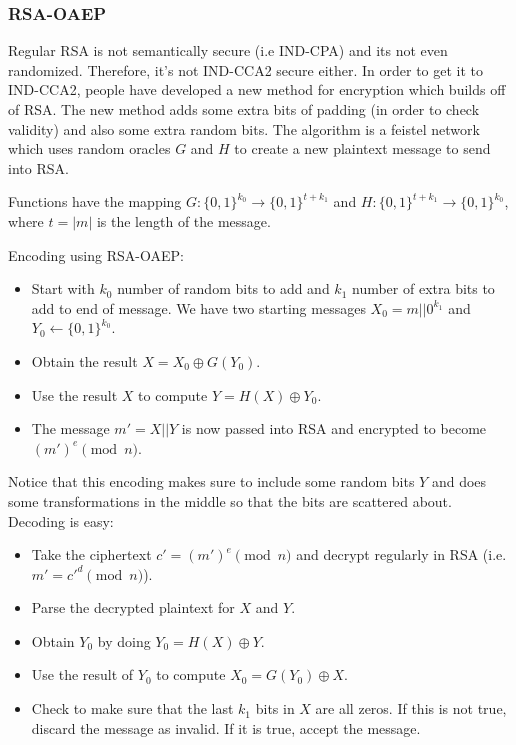 \documentclass[psamsfonts]{amsart}
\begin{document}
\subsubsection{RSA-OAEP}

Regular RSA is not semantically secure (i.e IND-CPA) and its not even randomized. Therefore, it's not IND-CCA2 secure either. In order to get it to IND-CCA2, people have developed a new method for encryption which builds off of RSA. The new method adds some extra bits of padding (in order to check validity) and also some extra random bits. The algorithm is a feistel network which uses random oracles $G$ and $H$ to create a new plaintext message to send into RSA.

Functions have the mapping $G: \{0,1\}^{k_0} \to \{0,1\}^{t + k_1}$ and $H: \{0,1\}^{t + k_1} \to \{0,1\}^{k_0}$, where $t = |m|$ is the length of the message.

Encoding using RSA-OAEP:
\begin{itemize}
  \item Start with $k_0$ number of random bits to add and $k_1$ number of extra bits to add to end of message. We have two starting messages $X_0 = m || 0^{k_1}$ and $Y_0 \leftarrow \{0,1\}^{k_0}$.
  \item Obtain the result $X = X_0 \oplus G(Y_0)$.
  \item Use the result $X$ to compute $Y = H(X) \oplus Y_0$.
  \item The message $m' = X || Y$ is now passed into RSA and encrypted to become $(m')^e \pmod{n}$.
\end{itemize}

Notice that this encoding makes sure to include some random bits $Y$ and does some transformations in the middle so that the bits are scattered about. Decoding is easy:
\begin{itemize}
  \item Take the ciphertext $c' = (m')^e \pmod{n}$ and decrypt regularly in RSA (i.e. $m' = c'^d \pmod{n}$).
  \item Parse the decrypted plaintext for $X$ and $Y$.
  \item Obtain $Y_0$ by doing $Y_0 = H(X) \oplus Y$.
  \item Use the result of $Y_0$ to compute $X_0 = G(Y_0) \oplus X$.
  \item Check to make sure that the last $k_1$ bits in $X$ are all zeros. If this is not true, discard the message as invalid. If it is true, accept the message.
\end{itemize}
\end{document}
